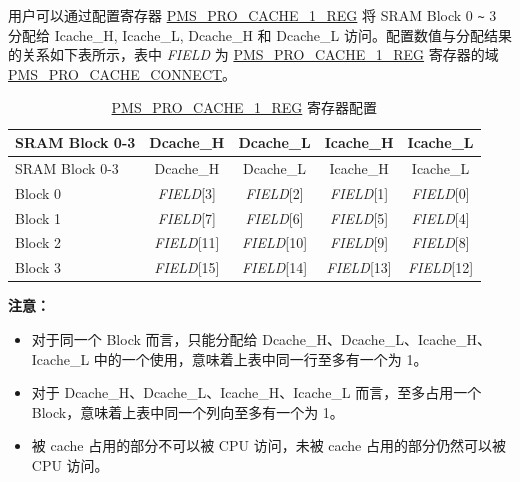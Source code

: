 \documentclass[main\_\_CN.tex]{subfiles}
\begin{document}
用户可以通过配置寄存器 \hyperref[regdesc:PMSPROCACHE1REG]{PMS\_PRO\_CACHE\_1\_REG} 将 SRAM Block 0 \verb+~+ 3 分配给 Icache\_H, Icache\_L, Dcache\_H 和 Dcache\_L 访问。配置数值与分配结果的关系如下表所示，表中 \textit{FIELD} 为 \hyperref[regdesc:PMSPROCACHE1REG]{PMS\_PRO\_CACHE\_1\_REG} 寄存器的域 \hyperref[fielddesc:PMSPROCACHECONNECT]{PMS\_PRO\_CACHE\_CONNECT}。

\begin{small}
\begin{longtable}[c]{|m{3cm}|c|c|c|c|}
    \caption{\hyperref[regdesc:PMSPROCACHE1REG]{PMS\_PRO\_CACHE\_1\_REG} 寄存器配置}
    \label{SRAMBlock0-3}
    \\\hline
    \rowcolor{lightgray}
    SRAM Block 0-3 & Dcache\_H & Dcache\_L &Icache\_H &Icache\_L \\
    \hline
    \endfirsthead
    \hline
    \rowcolor{lightgray}
    SRAM Block 0-3 & Dcache\_H & Dcache\_L &Icache\_H &Icache\_L \\
    \hline
    \endhead
    \endfoot
    \hline
    \endlastfoot

    Block 0 & \textit{FIELD}[3] & \textit{FIELD}[2] & \textit{FIELD}[1] &\textit{FIELD}[0]\\\hline

    Block 1 & \textit{FIELD}[7] & \textit{FIELD}[6] & \textit{FIELD}[5] &\textit{FIELD}[4]\\\hline

    Block 2 & \textit{FIELD}[11] & \textit{FIELD}[10] & \textit{FIELD}[9] &\textit{FIELD}[8]\\\hline

    Block 3 & \textit{FIELD}[15] & \textit{FIELD}[14] & \textit{FIELD}[13] &\textit{FIELD}[12]\\\hline

\end{longtable}
\end{small}

{\bfseries 注意：}
\begin{itemize}
    \item 对于同一个 Block 而言，只能分配给 Dcache\_H、Dcache\_L、Icache\_H、Icache\_L 中的一个使用，意味着上表中同一行至多有一个为 1。
    \item 对于 Dcache\_H、Dcache\_L、Icache\_H、Icache\_L 而言，至多占用一个 Block，意味着上表中同一个列向至多有一个为 1。
    \item 被 cache 占用的部分不可以被 CPU 访问，未被 cache 占用的部分仍然可以被 CPU 访问。
\end{itemize}
\end{document}
